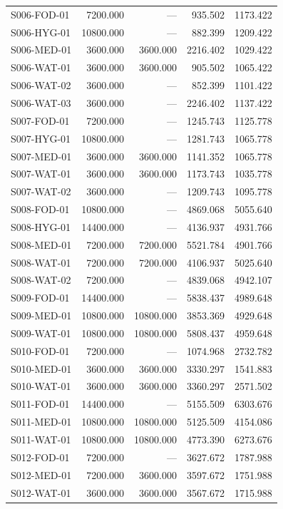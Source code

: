 \documentclass[a4paper]{my_paper}%
\numberwithin{equation}{section}
\theoremstyle{definition}
\begin{document}
\begin{longtable}{@{}lrrrr@{}}
S006-FOD-01 & 7200.000 & — & 935.502 & 1173.422\\
S006-HYG-01 & 10800.000 & — & 882.399 & 1209.422\\
S006-MED-01 & 3600.000 & 3600.000 & 2216.402 & 1029.422\\
S006-WAT-01 & 3600.000 & 3600.000 & 905.502 & 1065.422\\
S006-WAT-02 & 3600.000 & — & 852.399 & 1101.422\\
S006-WAT-03 & 3600.000 & — & 2246.402 & 1137.422\\
S007-FOD-01 & 7200.000 & — & 1245.743 & 1125.778\\
S007-HYG-01 & 10800.000 & — & 1281.743 & 1065.778\\
S007-MED-01 & 3600.000 & 3600.000 & 1141.352 & 1065.778\\
S007-WAT-01 & 3600.000 & 3600.000 & 1173.743 & 1035.778\\
S007-WAT-02 & 3600.000 & — & 1209.743 & 1095.778\\
S008-FOD-01 & 10800.000 & — & 4869.068 & 5055.640\\
S008-HYG-01 & 14400.000 & — & 4136.937 & 4931.766\\
S008-MED-01 & 7200.000 & 7200.000 & 5521.784 & 4901.766\\
S008-WAT-01 & 7200.000 & 7200.000 & 4106.937 & 5025.640\\
S008-WAT-02 & 7200.000 & — & 4839.068 & 4942.107\\
S009-FOD-01 & 14400.000 & — & 5838.437 & 4989.648\\
S009-MED-01 & 10800.000 & 10800.000 & 3853.369 & 4929.648\\
S009-WAT-01 & 10800.000 & 10800.000 & 5808.437 & 4959.648\\
S010-FOD-01 & 7200.000 & — & 1074.968 & 2732.782\\
S010-MED-01 & 3600.000 & 3600.000 & 3330.297 & 1541.883\\
S010-WAT-01 & 3600.000 & 3600.000 & 3360.297 & 2571.502\\
S011-FOD-01 & 14400.000 & — & 5155.509 & 6303.676\\
S011-MED-01 & 10800.000 & 10800.000 & 5125.509 & 4154.086\\
S011-WAT-01 & 10800.000 & 10800.000 & 4773.390 & 6273.676\\
S012-FOD-01 & 7200.000 & — & 3627.672 & 1787.988\\
S012-MED-01 & 7200.000 & 3600.000 & 3597.672 & 1751.988\\
S012-WAT-01 & 3600.000 & 3600.000 & 3567.672 & 1715.988\\

\end{longtable}
\end{document}
